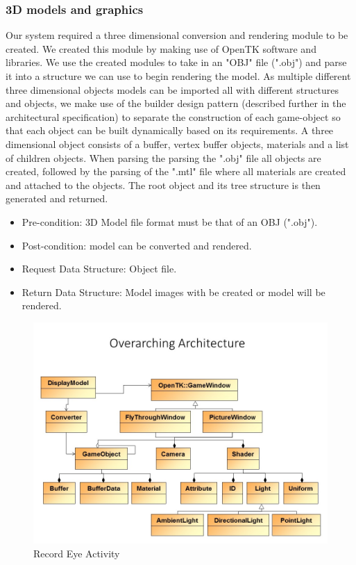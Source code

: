\subsubsection{3D models and graphics}
Our system required a three dimensional conversion and rendering module to be created. We created this module by making use of OpenTK software and libraries. We use the created modules to take in an "OBJ" file (".obj") and parse it into a structure we can use to begin rendering the model. As multiple different three dimensional objects models can be imported all with different structures and objects, we make use of the builder design pattern (described further in the architectural specification) to separate the construction of each game-object so that each object can be built dynamically based on its requirements. A three dimensional object consists of a buffer, vertex buffer objects, materials and a list of children objects. When parsing the parsing the ".obj" file all objects are created, followed by the parsing of the ".mtl" file where all materials are created and attached to the objects. The root object and its tree structure is then generated and returned.
\begin{itemize}
\item Pre-condition: 3D Model file format must be that of an OBJ (".obj").
\item Post-condition: model can be converted and rendered.
\item Request Data Structure: Object file.
\item Return Data Structure: Model images with be created or model will be rendered.
\end{itemize}

\begin{figure}[!ht]
	\centering
	\includegraphics[scale=0.5,width=15cm,keepaspectratio]{Diagrams/Slide2.jpg}
	\caption{Record Eye Activity}
	\end{figure}